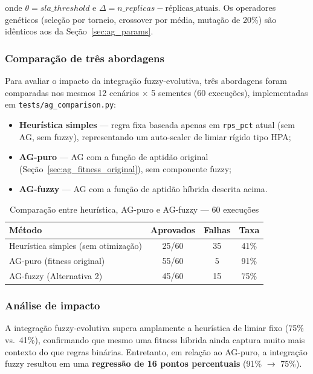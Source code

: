 \documentclass[12pt, a4paper]{article}
\begin{document}
onde $\theta = sla\_threshold$ e $\Delta = n\_replicas - \text{réplicas\_atuais}$. Os operadores genéticos (seleção por torneio, crossover por média, mutação de 20\%) são idênticos aos da Seção~\ref{sec:ag_params}.

\subsubsection{Comparação de três abordagens}

Para avaliar o impacto da integração fuzzy-evolutiva, três abordagens foram comparadas nos mesmos 12 cenários $\times$ 5 sementes (60 execuções), implementadas em \texttt{tests/ag\_comparison.py}:

\begin{itemize}
  \item \textbf{Heurística simples} — regra fixa baseada apenas em \texttt{rps\_pct} atual (sem AG, sem fuzzy), representando um auto-scaler de limiar rígido tipo HPA;
  \item \textbf{AG-puro} — AG com a função de aptidão original (Seção~\ref{sec:ag_fitness_original}), sem componente fuzzy;
  \item \textbf{AG-fuzzy} — AG com a função de aptidão híbrida descrita acima.
\end{itemize}

\begin{table}[H]
  \centering
  \caption{Comparação entre heurística, AG-puro e AG-fuzzy — 60 execuções}
  \label{tab:comparacao_fuzzy_ag}
  \begin{tabular}{lccc}
    \toprule
    \rowcolor{headerblue}
    \textbf{Método} & \textbf{Aprovados} & \textbf{Falhas} & \textbf{Taxa} \\
    \midrule
    Heurística simples (sem otimização) & 25/60 & 35 & 41\% \\
    AG-puro (fitness original)          & 55/60 &  5 & 91\% \\
    AG-fuzzy (Alternativa 2)            & 45/60 & 15 & 75\% \\
    \bottomrule
  \end{tabular}
\end{table}

\subsubsection{Análise de impacto}

A integração fuzzy-evolutiva supera amplamente a heurística de limiar fixo (75\% vs.\ 41\%), confirmando que mesmo uma fitness híbrida ainda captura muito mais contexto do que regras binárias. Entretanto, em relação ao AG-puro, a integração fuzzy resultou em uma \textbf{regressão de 16 pontos percentuais} (91\% $\rightarrow$ 75\%).
\end{document}
